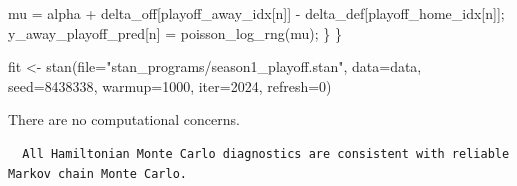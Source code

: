 \documentclass[
  letterpaper,
  DIV=11,
  numbers=noendperiod]{scrartcl}
\newenvironment{Shaded}{\begin{snugshade}}{\end{snugshade}}
\newcommand{\AttributeTok}[1]{\textcolor[rgb]{0.40,0.45,0.13}{#1}}
\newcommand{\ConstantTok}[1]{\textcolor[rgb]{0.56,0.35,0.01}{#1}}
\newcommand{\DecValTok}[1]{\textcolor[rgb]{0.68,0.00,0.00}{#1}}
\newcommand{\FunctionTok}[1]{\textcolor[rgb]{0.28,0.35,0.67}{#1}}
\newcommand{\NormalTok}[1]{\textcolor[rgb]{0.00,0.23,0.31}{#1}}
\newcommand{\OtherTok}[1]{\textcolor[rgb]{0.00,0.23,0.31}{#1}}
\newcommand{\SpecialCharTok}[1]{\textcolor[rgb]{0.37,0.37,0.37}{#1}}
\newcommand{\StringTok}[1]{\textcolor[rgb]{0.13,0.47,0.30}{#1}}
\begin{document}
\begin{codelisting}
\begin{Shaded}
\begin{Highlighting}[]
\NormalTok{    mu =  alpha}
\NormalTok{        + delta\_off[playoff\_away\_idx[n]]}
\NormalTok{        {-} delta\_def[playoff\_home\_idx[n]];}
\NormalTok{    y\_away\_playoff\_pred[n] = poisson\_log\_rng(mu);}
\NormalTok{  \}}
\NormalTok{\}}
\end{Highlighting}
\end{Shaded}

\end{codelisting}

\begin{Shaded}
\begin{Highlighting}[]
\NormalTok{fit }\OtherTok{\textless{}{-}} \FunctionTok{stan}\NormalTok{(}\AttributeTok{file=}\StringTok{"stan\_programs/season1\_playoff.stan"}\NormalTok{,}
            \AttributeTok{data=}\NormalTok{data, }\AttributeTok{seed=}\DecValTok{8438338}\NormalTok{,}
            \AttributeTok{warmup=}\DecValTok{1000}\NormalTok{, }\AttributeTok{iter=}\DecValTok{2024}\NormalTok{, }\AttributeTok{refresh=}\DecValTok{0}\NormalTok{)}
\end{Highlighting}
\end{Shaded}

There are no computational concerns.

\begin{Shaded}
\end{Shaded}

\begin{verbatim}
  All Hamiltonian Monte Carlo diagnostics are consistent with reliable
Markov chain Monte Carlo.
\end{verbatim}

\begin{Shaded}
\end{Shaded}
\end{document}
